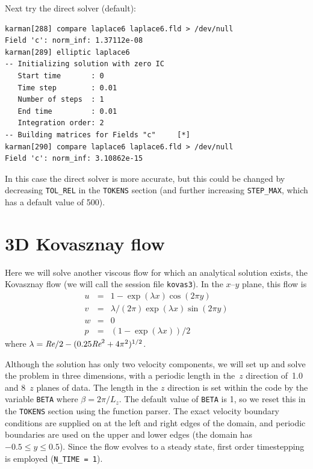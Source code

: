 \documentclass[11pt,a4paper]{report}
\def\Rey{\mbox{\it Re}}                             %
\begin{document}
Next try the direct solver (default):
{\small
\begin{verbatim}
karman[288] compare laplace6 laplace6.fld > /dev/null
Field 'c': norm_inf: 1.37112e-08
karman[289] elliptic laplace6
-- Initializing solution with zero IC
   Start time       : 0
   Time step        : 0.01
   Number of steps  : 1
   End time         : 0.01
   Integration order: 2
-- Building matrices for Fields "c"     [*]
karman[290] compare laplace6 laplace6.fld > /dev/null
Field 'c': norm_inf: 3.10862e-15
\end{verbatim}
}
\noindent
In this case the direct solver is more accurate, but this could be changed
by decreasing \verb+TOL_REL+ in the \texttt{TOKENS} section (and further
increasing \verb+STEP_MAX+, which has a default value of 500).

\section{3D Kovasznay flow}

Here we will solve another viscous flow for which an analytical
solution exists, the Kovasznay flow (we will call the session file
\verb+kovas3+).  In the $x$--$y$ plane, this flow is
\begin{eqnarray}
        u &=& 1 - \exp(\lambda x)\cos(2\pi y)           \\
        v &=& \lambda/(2\pi)\exp(\lambda x)\sin(2\pi y) \\
        w &=& 0                                         \\
        p &=& (1 - \exp(\lambda x))/2   
\end{eqnarray}
where $\lambda = \Rey/2 - (0.25\Rey^2 + 4\pi^2)^{1/2}$.

Although the solution has only two velocity components, we will set up
and solve the problem in three dimensions, with a periodic length in
the~$z$ direction of~1.0 and 8~$z$ planes of data.  The length in the
$z$ direction is set within the code by the variable \verb+BETA+ where
$\beta=2\pi/L_z$.  The default value of \verb+BETA+ is 1, so we reset
this in the \texttt{TOKENS} section using the function parser.  The
exact velocity boundary conditions are supplied on at the left and
right edges of the domain, and periodic boundaries are used on the
upper and lower edges (the domain has $-0.5\le y\le0.5$).  Since the
flow evolves to a steady state, first order timestepping is employed
(\verb+N_TIME = 1+).
\end{document}

